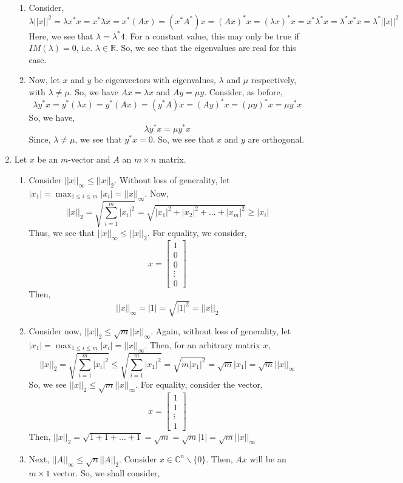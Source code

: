 \documentclass[letterpaper,10pt]{article}
\newcommand{\R}{\mathbb{R}}
\newcommand{\C}{\mathbb{C}}
\begin{document}
\begin{enumerate}
\begin{enumerate}
\item Consider,
\[\lambda||x||^2=\lambda x^*x=x^*\lambda x=x^*(Ax)=(x^*A^*)x=(Ax)^*x=(\lambda x)^*x=x^*\lambda^*x=\lambda^*x^*x=\lambda^*||x||^2\]
Here, we see that $\lambda=\lambda^*4$. For a constant value, this may only be true if $IM(\lambda)=0$, i.e. $\lambda\in \R$. So, we see that the eigenvalues are real for this case.
\item Now, let $x$ and $y$ be eigenvectors with eigenvalues, $\lambda$ and $\mu$ respectively, with $\lambda \neq \mu$. So, we have $Ax=\lambda x$ and $Ay=\mu y$. Consider, as before,
\[\lambda y^*x=y^*(\lambda x)=y^*(Ax)=(y^*A)x=(Ay)^*x=(\mu y)^*x=\mu y^*x\]
So, we have,
\[\lambda y^*x=\mu y^*x\]
Since, $\lambda \neq \mu$, we see that $y^*x=0$. So, we see that $x$ and $y$ are orthogonal. 
\end{enumerate}
\item Let $x$ be an $m$-vector and $A$ an $m\times n$ matrix.
\begin{enumerate}
\item Consider $||x||_{\infty}\leq ||x||_2$. Without loss of generality, let $|x_{1}|=\max_{1\leq i\leq m}|x_i|=||x||_{\infty}$. Now, 
\[||x||_2=\sqrt{\sum_{i=1}^m|x_i|^2}=\sqrt{|x_1|^2+|x_2|^2+\ldots+|x_m|^2}\geq |x_i|\]
Thus, we see that $||x||_{\infty}\leq ||x||_2$. For equality, we consider,
\[x=\begin{bmatrix}
1\\0\\0\\\vdots\\ 0
\end{bmatrix}\]
Then,
\[||x||_{\infty}=|1|=\sqrt{|1|^2}=||x||_2\]
\item Consider now, $||x||_2\leq \sqrt{m}||x||_{\infty}$. Again, without loss of generality, let $|x_1|=\max_{1\leq i\leq m}|x_i|=||x||_{\infty}$. Then, for an arbitrary matrix $x$,
\[||x||_2=\sqrt{\sum_{i=1}^m|x_i|^2}\leq \sqrt{\sum_{i=1}^m|x_1|^2}=\sqrt{m|x_1|^2}=\sqrt{m}|x_1|=\sqrt{m}||x||_{\infty}\]
So, we see $||x||_2\leq \sqrt{m}||x||_{\infty}$. For equality, consider the vector,
\[x=\begin{bmatrix}
1\\1\\ \vdots \\1
\end{bmatrix} \]
Then, $||x||_2=\sqrt{1+1+\ldots+1}=\sqrt{m}=\sqrt{m}|1|=\sqrt{m}||x||_{\infty}$
\item Next, $||A||_{\infty}\leq \sqrt{n}||A||_2$. Consider $x\in \C^n\backslash\{0\}$. Then, $Ax$ will be an $m\times 1$ vector. So, we shall consider,

\end{enumerate}
\end{enumerate}
\end{document}
